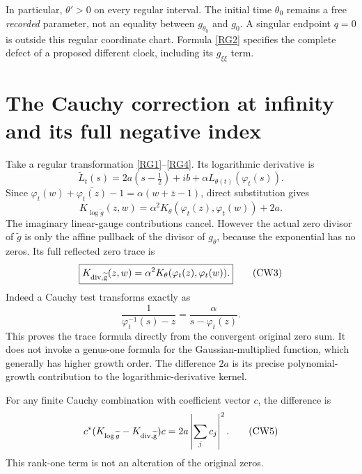 \documentclass[11pt,a4paper]{article}
\theoremstyle{definition}\newtheorem{definition}[theorem]{Definition}
\begin{document}
In particular, $\theta'>0$ on every regular interval. The initial time $\theta_0$ remains a free \emph{recorded} parameter, not an equality between $g_{\theta_0}$ and $g_0$. A singular endpoint $q=0$ is outside this regular coordinate chart. Formula \eqref{RG2} specifies the complete defect of a proposed different clock, including its $g_{\xi\xi}$ term.

\section{The Cauchy correction at infinity and its full negative index}
Take a regular transformation \eqref{RG1}--\eqref{RG4}. Its logarithmic derivative is
\begin{equation}
 \widetilde L_t(s)=2a(s-\tfrac12)+ib+
                 \alpha L_{\theta(t)}(\varphi_t(s)).          \tag{CW1}\label{CW1}
\end{equation}
Since $\varphi_t(w)+\overline{\varphi_t(z)}-1
=\alpha(w+\bar z-1)$, direct substitution gives
\begin{equation}
 \boxed{K_{\log\widetilde g}(z,w)
   =\alpha^2K_\theta(\varphi_t(z),\varphi_t(w))+2a.}
                                                               \tag{CW2}\label{CW2}
\end{equation}
The imaginary linear-gauge contributions cancel. However the actual zero divisor of $\widetilde g$ is only the affine pullback of the divisor of $g_\theta$, because the exponential has no zeros. Its full reflected zero trace is
\begin{equation}
 \boxed{K_{\rm div,\widetilde g}(z,w)
        =\alpha^2K_\theta(\varphi_t(z),\varphi_t(w)).}
                                                               \tag{CW3}\label{CW3}
\end{equation}
Indeed a Cauchy test transforms exactly as
\begin{equation}
 \frac1{\varphi_t^{-1}(s)-z}
       =\frac{\alpha}{s-\varphi_t(z)}.                        \tag{CW4}\label{CW4}
\end{equation}
This proves the trace formula directly from the convergent original zero sum. It does not invoke a genus-one formula for the Gaussian-multiplied function, which generally has higher growth order. The difference $2a$ is its precise polynomial-growth contribution to the logarithmic-derivative kernel.

For any finite Cauchy combination with coefficient vector $c$, the difference is
\begin{equation}
 c^*(K_{\log\widetilde g}-K_{\rm div,\widetilde g})c
 =2a\left|\sum_jc_j\right|^2.                                \tag{CW5}\label{CW5}
\end{equation}
This rank-one term is not an alteration of the original zeros.
\end{document}
